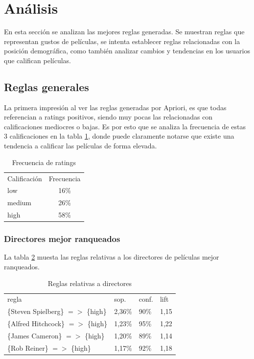 \documentclass[journal]{IEEEtran}
\begin{document}
\section{Análisis}
En esta sección se analizan las mejores reglas generadas. 
Se muestran reglas que representan gustos
de películas, se intenta establecer reglas relacionadas con la
posición demográfica, como también analizar cambios y tendencias 
en los usuarios que califican películas.

\subsection{Reglas generales}
La primera impresión al ver las reglas generadas por Apriori, es que todas 
referencian a ratings positivos, siendo muy pocas las relacionadas con 
calificaciones mediocres o bajas. Es por esto que se analiza la frecuencia
de estas 3 calificaciones en la tabla \ref{rating_freq}, donde puede
claramente notarse que existe una tendencia a calificar las 
películas de forma elevada.

\begin{table}[ht!]
\caption{Frecuencia de ratings}
\label{rating_freq}
\centering
\begin{tabular}{l c}
Calificación & Frecuencia \\
low &  16\% \\
medium & 26\% \\
high & 58\%
\end{tabular}
\end{table}

\subsubsection{Directores mejor ranqueados}
La tabla \ref{table_best_directors} muesta las reglas relativas a los 
directores de películas mejor ranqueados.
\begin{table}[ht!]
\caption{Reglas relativas a directores}
\label{table_best_directors}
\centering
\begin{tabular}{l l l l }
regla & sop. & conf. & lift \\
\{Steven Spielberg\} $=$$>$ \{high\} & 2,36\% & 90\% & 1,15 \\
\{Alfred Hitchcock\} $=$$>$ \{high\} & 1,23\% & 95\% & 1,22 \\
\{James Cameron\} $=$$>$ \{high\} & 1,20\% & 89\% & 1,14 \\
\{Rob Reiner\} $=$$>$ \{high\} & 1,17\% & 92\% & 1,18
\end{tabular}
\end{table}
\end{document}
